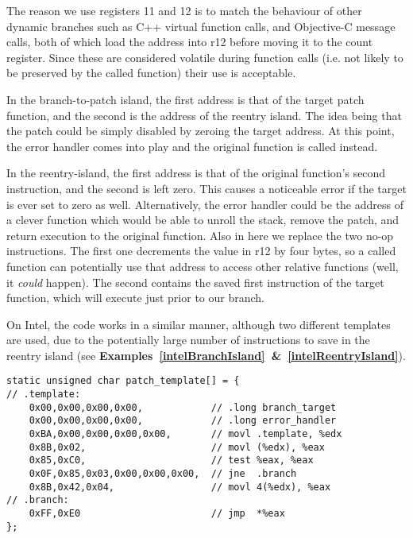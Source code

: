 \documentclass[english]{article}
\begin{document}
The reason we use registers 11 and 12 is to match the behaviour of other dynamic branches such as C++ virtual function calls, and Objective-C message calls, both of which load the address into r12 before moving it to the count register. Since these are considered volatile during function calls (i.e. not likely to be preserved by the called function) their use is acceptable.

In the branch-to-patch island, the first address is that of the target patch function, and the second is the address of the reentry island. The idea being that the patch could be simply disabled by zeroing the target address. At this point, the error handler comes into play and the original function is called instead.

In the reentry-island, the first address is that of the original function's second instruction, and the second is left zero. This causes a noticeable error if the target is ever set to zero as well. Alternatively, the error handler could be the address of a clever function which would be able to unroll the stack, remove the patch, and return execution to the original function.
Also in here we replace the two no-op instructions. The first one decrements the value in r12 by four bytes, so a called function can potentially use that address to access other relative functions (well, it \emph{could} happen). The second contains the saved first instruction of the target function, which will execute just prior to our branch.

On Intel, the code works in a similar manner, although two different templates are used, due to the potentially large number of instructions to save in the reentry island (see \textbf{Examples~\ref{intelBranchIsland}~\&~\ref{intelReentryIsland}}).

\begin{lstlisting}[label=intelBranchIsland, caption=The IA-32 branch-to-patch island template.]
static unsigned char patch_template[] = {
// .template:
    0x00,0x00,0x00,0x00,            // .long branch_target
    0x00,0x00,0x00,0x00,            // .long error_handler
    0xBA,0x00,0x00,0x00,0x00,       // movl .template, %edx
    0x8B,0x02,                      // movl (%edx), %eax
    0x85,0xC0,                      // test %eax, %eax
    0x0F,0x85,0x03,0x00,0x00,0x00,  // jne  .branch
    0x8B,0x42,0x04,                 // movl 4(%edx), %eax
// .branch:
    0xFF,0xE0                       // jmp  *%eax
};
\end{lstlisting}
\end{document}
